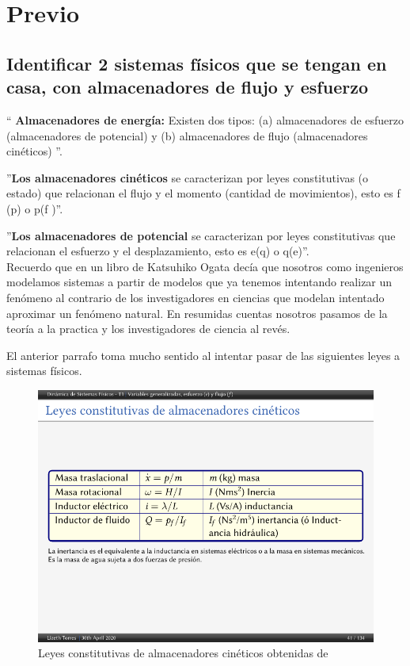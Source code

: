 \noindent \justifying
\section{Previo}


\subsection{Identificar 2 sistemas físicos que se tengan en casa, con almacenadores de flujo y esfuerzo}


`` \textbf{Almacenadores de energía:} Existen dos tipos: (a) almacenadores de esfuerzo (almacenadores de potencial) y (b) almacenadores de flujo
(almacenadores cinéticos) ''\cite{w1}.

''\textbf{Los almacenadores cinéticos} se caracterizan por leyes constitutivas (o
estado) que relacionan el flujo y el momento (cantidad de movimientos),
esto es f (p) o p(f )''\cite{w1}.


''\textbf{Los almacenadores de potencial} se caracterizan por leyes
constitutivas que relacionan el esfuerzo y el desplazamiento, esto es e(q)
o q(e)''\cite{w1}.\\

Recuerdo que en un libro de Katsuhiko Ogata decía que nosotros como ingenieros modelamos sistemas a partir de modelos que ya tenemos intentando realizar un fenómeno al contrario de los investigadores en ciencias que modelan intentado aproximar un fenómeno natural. En resumidas cuentas nosotros pasamos de la teoría a la practica y los investigadores de ciencia al revés.

El anterior parrafo toma mucho sentido al intentar pasar de las siguientes leyes a sistemas físicos.

\begin{figure}[H]
	\centering
	\caption{Leyes constitutivas de almacenadores cinéticos obtenidas de \cite{w1}}
	\includegraphics[width=0.7\linewidth]{latex/tabla1}

	\label{fig:tabla1}
\end{figure}

